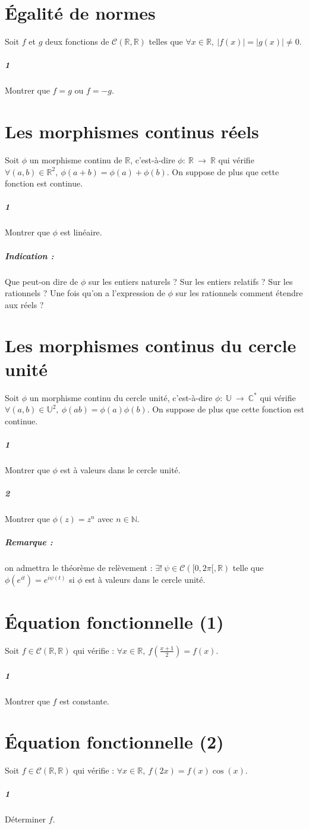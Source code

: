 \documentclass[10pt,a4paper]{article}
\begin{document}
\section{Égalité de normes}
Soit $f$ et $g$ deux fonctions de $\mathcal{C}(\mathbb{R},\mathbb{R})$ telles que $\forall x \in \mathbb{R}, \ \vert f(x) \vert = \vert g(x) \vert \neq 0$.
\subparagraph{1} Montrer que $f=g$ ou $f=-g$.

\section{Les morphismes continus réels}
Soit $\phi$ un morphisme continu de $\mathbb{R}$, c'est-à-dire $\phi: \ \mathbb{R} \ \rightarrow  \ \mathbb{R}$ qui vérifie $\forall (a,b) \in \mathbb{R}^2, \ \phi(a+b)=\phi(a)+\phi(b)$. On suppose de plus que cette fonction est continue.
\subparagraph{1}Montrer que $\phi$ est linéaire.
\subparagraph{Indication :} Que peut-on dire de $\phi$ sur les entiers naturels ? Sur les entiers relatifs ? Sur les rationnels ? Une fois qu'on a l'expression de $\phi$ sur les rationnels comment étendre aux réels ?

\section{Les morphismes continus du cercle unité}
Soit $\phi$ un morphisme continu du cercle unité, c'est-à-dire $\phi : \ \mathbb{U} \ \rightarrow \ \mathbb{C}^*$ qui vérifie $\forall (a,b) \in \mathbb{U}^2, \ \phi(ab)=\phi(a)\phi(b)$. On suppose de plus que cette fonction est continue.
\subparagraph{1}Montrer que $\phi$ est à valeurs dans le cercle unité.
\subparagraph{2} Montrer que $\phi(z)=z^n$ avec $n \in \mathbb{N}$.
\subparagraph{Remarque :} on admettra le théorème de relèvement : $\exists! \ \psi \in \mathcal{C}([0,2\pi[,\mathbb{R})$ telle que $\phi(e^{it})=e^{i\psi(t)}$ si $\phi$ est à valeurs dans le cercle unité.

\section{Équation fonctionnelle (1)}
Soit $f \in \mathcal{C}(\mathbb{R},\mathbb{R})$ qui vérifie : $\forall x \in \mathbb{R}, \ f \left( \frac{x+1}{2} \right) = f(x)$.
\subparagraph{1} Montrer que $f$ est constante.

\section{Équation fonctionnelle (2)}
Soit $f \in \mathcal{C}(\mathbb{R},\mathbb{R})$ qui vérifie : $\forall x \in \mathbb{R}, \ f(2x)=f(x) \cos(x)$. 
\subparagraph{1} Déterminer $f$.
\end{document}
